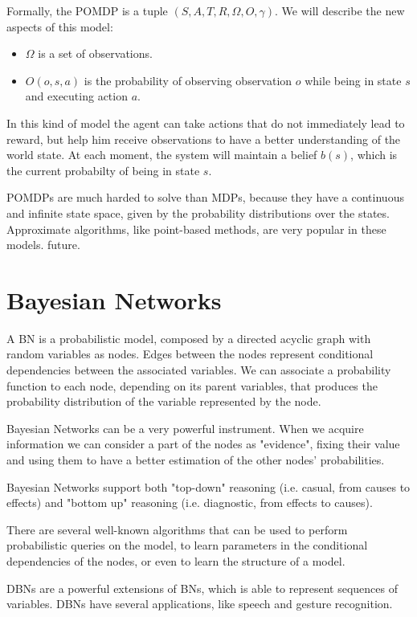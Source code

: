 Formally, the POMDP is a tuple $(S,A,T,R,\Omega,O,\gamma)$. We will describe the new aspects of this model:
\begin{itemize}
\item $\Omega$ is a set of observations.
\item $O(o,s,a)$ is the probability of observing observation $o$ while being in state $s$ and executing action $a$.
\end{itemize}

In this kind of model the agent can take actions that do not immediately lead to reward, but help him receive observations to have a better understanding of the world state. At each moment, the system will maintain a belief $b(s)$, which is the current probabilty of being in state $s$.

POMDPs are much harded to solve than MDPs, because they have a continuous and infinite state space, given by the probability distributions over the states. Approximate algorithms, like point-based methods, are very popular in these models.
future.

\section{Bayesian Networks}
 A BN is a probabilistic model, composed by a directed acyclic graph with random variables as nodes. Edges between the nodes represent conditional dependencies between the associated variables. We can associate a probability function to each node, depending on its parent variables, that produces the probability distribution of the variable represented by the node. 

 Bayesian Networks can be a very powerful instrument. When we acquire information we can consider a part of the nodes as "evidence", fixing their value and using them to have a better estimation of the other nodes' probabilities. 

 Bayesian Networks support both "top-down" reasoning (i.e. casual, from causes to effects) and "bottom up" reasoning (i.e. diagnostic, from effects to causes).

There are several well-known algorithms that can be used to perform probabilistic queries on the model, to learn parameters in the conditional dependencies of the nodes, or even to learn the structure of a model.

DBNs are a powerful extensions of BNs, which is able to represent sequences of variables. DBNs have several applications, like speech and gesture recognition.